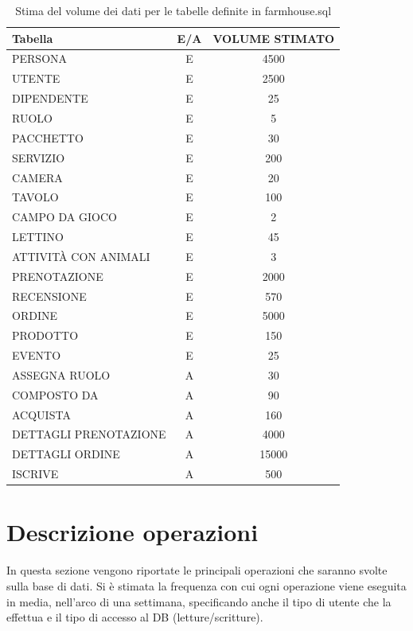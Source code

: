 \documentclass[a4paper,11pt]{report}
\begin{document}
\begin{table}[H]
	\centering
	\small
	\renewcommand{\arraystretch}{1.15}
	\begin{tabularx}{\textwidth}{|X|c|c|}
		\hline
		\rowcolor{gray!20}
		\textbf{Tabella}     & \textbf{E/A} & \textbf{VOLUME STIMATO} \\
		\hline
		PERSONA				& E & 4500 \\
		UTENTE				& E & 2500 \\
		DIPENDENTE			& E & 25 \\ 
		RUOLO 				& E & 5 \\
		PACCHETTO 			& E & 30 \\
		SERVIZIO 			& E & 200 \\
		CAMERA 				& E & 20 \\
		TAVOLO				& E & 100  \\
		CAMPO DA GIOCO 		& E & 2 \\
		LETTINO 			& E & 45 \\
		ATTIVITÀ CON ANIMALI & E & 3 \\
		PRENOTAZIONE 		& E & 2000 \\ 
		RECENSIONE 			& E & 570 \\ 
		ORDINE 				& E & 5000 \\ 
		PRODOTTO 			& E & 150 \\
		EVENTO 				& E & 25 \\
		ASSEGNA RUOLO 		& A & 30 \\
		COMPOSTO DA 		& A & 90 \\ 
		ACQUISTA 			& A & 160 \\ 
		DETTAGLI PRENOTAZIONE & A & 4000 \\ 
		DETTAGLI ORDINE 	& A & 15000 \\
		ISCRIVE				& A & 500 \\
		\hline
	\end{tabularx}
	\caption{Stima del volume dei dati per le tabelle definite in farmhouse.sql}
\end{table}

\section{Descrizione operazioni}
In questa sezione vengono riportate le principali operazioni che saranno svolte sulla base di dati.
Si è stimata la frequenza con cui ogni operazione viene eseguita in media, nell'arco di una settimana,
specificando anche il tipo di utente che la effettua e il tipo di accesso al DB (letture/scritture).
\end{document}
